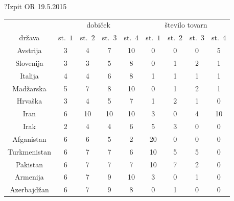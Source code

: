 \begin{naloga}{?}{Izpit OR 19.5.2015}
\begin{vprasanje}[nijke]
\begin{tabela}
\begin{tabular}{c|cccc|cccc}
& \multicolumn{4}{|c|}{dobiček}
& \multicolumn{4}{c}{število tovarn} \\
država & st.~$1$ & st.~$2$ & st.~$3$ & st.~$4$
& st.~$1$ & st.~$2$ & st.~$3$ & st.~$4$ \\ \hline
Avstrija     & 3 &  4 &  7 & 10 &  0 & 0 & 0 &  5 \\
Slovenija    & 3 &  3 &  5 &  8 &  0 & 1 & 2 &  1 \\
Italija      & 4 &  4 &  6 &  8 &  1 & 1 & 1 &  1 \\
Madžarska    & 5 &  7 &  8 & 10 &  0 & 1 & 2 &  1 \\
Hrvaška      & 3 &  4 &  5 &  7 &  1 & 2 & 1 &  0 \\ \hline
Iran         & 6 & 10 & 10 & 10 &  3 & 0 & 4 & 10 \\
Irak         & 2 &  4 &  4 &  6 &  5 & 3 & 0 &  0 \\
Afganistan   & 6 &  6 &  5 &  2 & 20 & 0 & 0 &  0 \\
Turkmenistan & 6 &  7 &  7 &  6 & 10 & 5 & 5 &  0 \\
Pakistan     & 6 &  7 &  7 &  7 & 10 & 7 & 2 &  0 \\
Armenija     & 6 &  7 &  9 & 10 &  3 & 0 & 1 &  0 \\
Azerbajdžan  & 6 &  7 &  9 &  8 &  0 & 1 & 0 &  0 \\
\end{tabular}
\end{tabela}
\end{vprasanje}
\begin{odgovor}
\end{odgovor}
\end{naloga}


